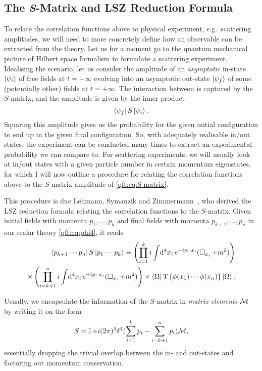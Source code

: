 \documentclass[../main.tex]{subfiles}
\begin{document}
\subsection{The \textit{S}-Matrix and LSZ Reduction Formula}
To relate the correlation functions above to physical experiment, e.g.\ scattering amplitudes, we will need to more concretely define how an observable can be extracted from the theory.
Let us for a moment go to the quantum mechanical picture of Hilbert space formalism to formulate a scattering experiment.
Idealising the scenario, let us consider the amplitude of an \emph{asymptotic} in-state \(\left| \psi_i \right\rangle\) of free fields at \(t=-\infty\) evolving into an asymptotic out-state \(\left| \psi_f \right\rangle\) of some (potentially other) fields at \(t=+\infty\).
The interaction between is captured by the \(S\)-matrix, and the amplitude is given by the inner product
\begin{equation}
  \label{qft:eq:S-matrix}
  \left\langle \psi_f \right| S \left| \psi_i \right\rangle.
\end{equation}
Squaring this amplitude gives us the probability for the given initial configuration to end up in the given final configuration.
So, with adequately realisable in/out states, the experiment can be conducted many times to extract an experimental probability we can compare to.
For scattering experiments, we will usually look at in/out states with a given particle number in certain momentum eigenstates, for which I will now outline a procedure for relating the correlation functions above to the \(S\)-matrix amplitude of \cref{qft:eq:S-matrix}.

This procedure is due Lehmann, Symanzik and Zimmermann~\cite{LSZ}, who derived the LSZ reduction formula relating the correlation functions to the \(S\)-matrix.
Given initial fields with momenta \(p_1, \ldots, p_k\) and final fields with momenta \(p_{k+1}, \ldots, p_n\) in our scalar theory \cref{qft:eq:phi4}, it reads~\cite{Schwartz:2014sze}
\begin{align}
  \label{qft:eq:LSZ_S-matrix}
  \nonumber
  \left\langle p_{k+1}\cdots p_n \right| S \left| p_1 \cdots p_k \right\rangle = \left(\prod_{i=1}^k i \int \!\mathrm{d}^4x_i\, e^{-ip_i \cdot x_i} (\operatorname{\Box}_{x_i} + m^2)\right) \\
  \times \left(\prod_{i=k+1}^n i \int \!\mathrm{d}^4x_i\, e^{+ip_i \cdot x_i} (\operatorname{\Box}_{x_i} + m^2)\right)
  \times \left\langle \Omega \right| \operatorname{T}\left\{\phi(x_1)\cdots \phi(x_n)\right\} \left| \Omega \right\rangle.
\end{align}

Usually, we encapsulate the information of the \(S\)-matrix in \emph{matrix elements} \(\mathcal{M}\) by writing it on the form
\begin{equation}
  \label{qft:eq:S-matrix_expansion}
  S = \operatorname{\mathbb{I}} + i(2\pi)^4 \delta^4(\sum_{i=1}^k p_i - \sum_{i=k+1}^n p_i) \mathcal{M},
\end{equation}
essentially dropping the trivial overlap between the in- and out-states and factoring out momentum conservation.
\medskip
\end{document}
